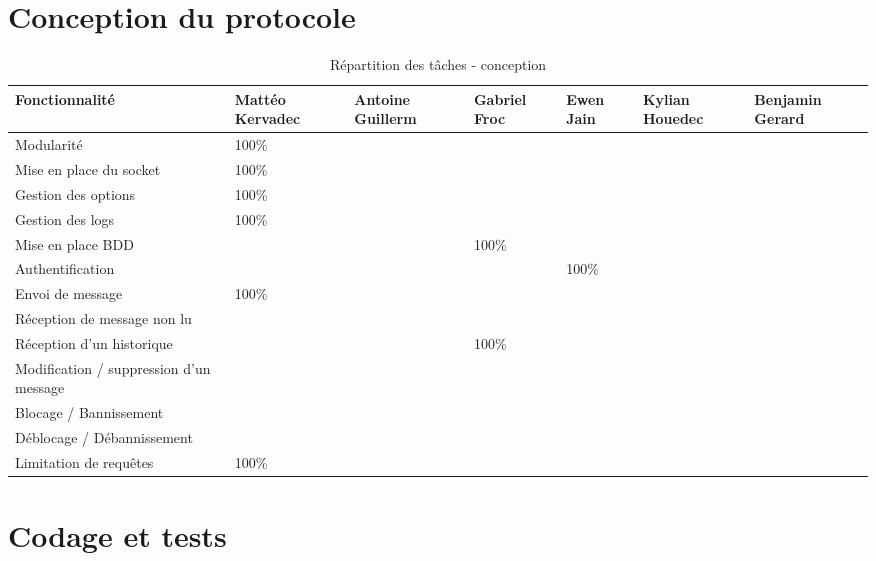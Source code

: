 \documentclass{report}
\begin{document}
\chapter{Conception du protocole}

\begin{table}[ht]
\hspace{-1cm}  %
\begin{tabular}{|p{3cm}|p{2cm}|p{2cm}|p{2cm}|p{2cm}|p{2cm}|p{2cm}|}
\hline
\textbf{Fonctionnalité} & \textbf{Mattéo Kervadec} & \textbf{Antoine Guillerm} & \textbf{Gabriel Froc} & \textbf{Ewen Jain} & \textbf{Kylian Houedec} & \textbf{Benjamin Gerard} \\
\hline
Modularité & 100\% & & & & & \\
\hline
Mise en place du socket & 100\% & & & & & \\
\hline
Gestion des options & 100\% & & & & & \\
\hline
Gestion des logs & 100\% & & & & & \\
\hline
Mise en place BDD & & & 100\% & & & \\
\hline
Authentification & & & & 100\% & & \\
\hline
Envoi de message & 100\% & & & & & \\
\hline
Réception de message non lu & & & & & & \\
\hline
Réception d'un historique & & & 100\% & & & \\
\hline
Modification / suppression d'un message & & & & & & \\
\hline
Blocage / Bannissement & & & & & & \\
\hline
Déblocage / Débannissement &  & & & & & \\
\hline
Limitation de requêtes & 100\% & & & & & \\
\hline
\end{tabular}
\caption{Répartition des tâches - conception}
\end{table}

\chapter{Codage et tests}
\end{document}
